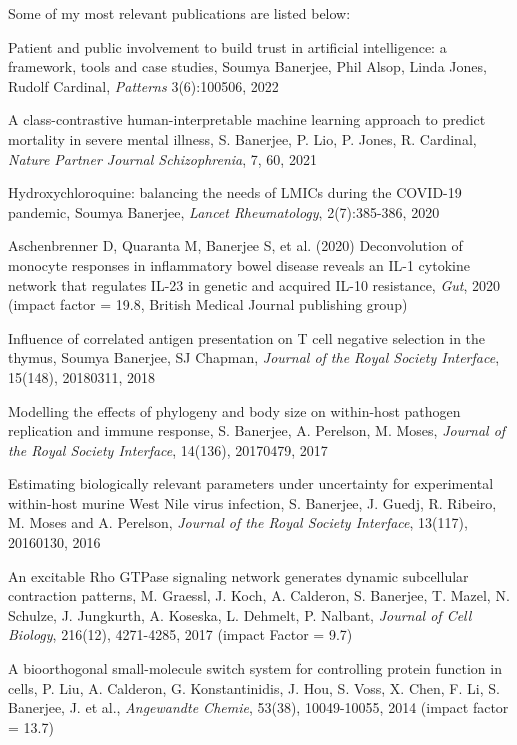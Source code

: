 \documentclass[10pt]{article}
\begin{document}
\begin{enumerate}

Some of my most relevant publications are listed below:

Patient and public involvement to build trust in artificial intelligence: a framework, tools and case studies, Soumya Banerjee, Phil Alsop, Linda Jones, Rudolf Cardinal, \textit{Patterns} 3(6):100506, 2022

A class-contrastive human-interpretable machine learning approach to predict mortality in severe mental illness, S. Banerjee, P. Lio, P. Jones, R. Cardinal, \textit{Nature Partner Journal Schizophrenia}, 7, 60, 2021

Hydroxychloroquine: balancing the needs of LMICs during the COVID-19 pandemic, Soumya Banerjee, \textit{Lancet Rheumatology}, 2(7):385-386, 2020

Aschenbrenner D, Quaranta M, Banerjee S,  et al. (2020) Deconvolution of monocyte responses in inflammatory bowel disease reveals an IL-1 cytokine network that regulates IL-23 in genetic and acquired IL-10 resistance, \textit{Gut}, 2020 (impact factor = 19.8, British Medical Journal publishing group)

Influence of correlated antigen presentation on T cell negative selection in the thymus, Soumya Banerjee, SJ Chapman, \textit{Journal of the Royal Society Interface}, 15(148), 20180311, 2018

Modelling the effects of phylogeny and body size on within-host pathogen
replication and immune response, S. Banerjee, A. Perelson, M. Moses, \textit{Journal of the Royal Society Interface}, 14(136), 20170479, 2017 

Estimating biologically relevant parameters under uncertainty for experimental within-host murine West Nile virus infection, S. Banerjee, J. Guedj, R. Ribeiro, M. Moses and A. Perelson, \textit{Journal of the Royal Society Interface}, 13(117), 20160130, 2016

An excitable Rho GTPase signaling network generates dynamic subcellular
contraction patterns, M. Graessl, J. Koch, A. Calderon, S. Banerjee, T. Mazel, N.
Schulze, J. Jungkurth, A. Koseska, L. Dehmelt, P. Nalbant, \textit{Journal of Cell Biology}, 216(12), 4271-4285, 2017 (impact Factor = 9.7)

A bioorthogonal small-molecule switch system for controlling protein function in
cells, P. Liu, A. Calderon, G. Konstantinidis, J. Hou, S. Voss, X. Chen, F. Li, S. Banerjee, J. et al., \textit{Angewandte Chemie}, 53(38), 10049-10055, 2014 (impact factor = 13.7)


\end{enumerate}
\end{document}
